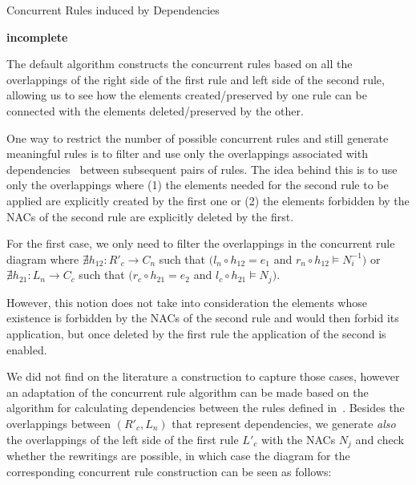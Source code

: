\begin{definition}{Concurrent Rules induced by Dependencies}

  \textbf{incomplete}

  The default algorithm constructs the concurrent rules based on all the overlappings of the right side of the first rule and left side of the second rule, allowing us to see how the elements created/preserved by one rule can be connected with the elements deleted/preserved by the other.

  One way to restrict the number of possible concurrent rules and still generate meaningful rules is to filter and use only the overlappings associated with dependencies~\cite{Lambers2006} between subsequent pairs of rules. The idea behind this is to use only the overlappings where (1) the elements needed for the second rule to be applied are explicitly created by the first one or (2) the elements forbidden by the NACs of the second rule are explicitly deleted by the first.

  For the first case, we only need to filter the overlappings in the concurrent rule diagram where $\nexists h_{12} : R'_c \rightarrow C_n$ such that $(l_n \circ h_{12} = e_1$ and $r_n \circ h_{12} \models N^{-1}_i)$ or $\nexists h_{21} : L_n \rightarrow C_c$ such that $(r_c \circ h_{21} = e_2$ and $l_c \circ h_{21} \models N_j)$.

  However, this notion does not take into consideration the elements whose existence is forbidden by the NACs of the second rule and would then forbid its application, but once deleted by the first rule the application of the second is enabled.

  We did not find on the literature a construction to capture those cases, however an adaptation of the concurrent rule algorithm can be made based on the algorithm for calculating dependencies between the rules defined in~\cite{Lambers2006}. Besides the overlappings between $(R'_c, L_n)$ that represent dependencies, we generate \emph{also} the overlappings of the left side of the first rule $L'_c$ with the NACs $N_j$ and check whether the rewritings are possible, in which case the
  diagram for the corresponding concurrent rule construction can be seen as follows:


\end{definition}

